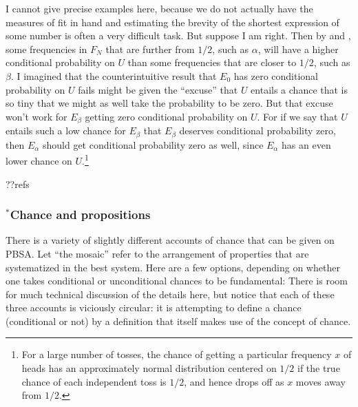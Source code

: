 I cannot give precise examples here, because
we do not actually have the measures of fit in hand and estimating the brevity of the shortest expression of some number is often a very
difficult task. But suppose I am right. Then by  and , some frequencies in $F_N$ that are further from
$1/2$, such as $\alpha$, will have a higher conditional probability on $U$ than some frequencies that are closer to $1/2$, such as
$\beta$. I imagined that the counterintuitive result that $E_0$ has zero conditional probability on $U$ fails might be given the ``excuse''
that $U$ entails a chance that is so tiny that we might as well take the probability to be zero. But that excuse won't work for $E_\beta$
getting zero conditional probability on $U$. For if we say that $U$ entails such a low chance for $E_\beta$ that $E_\beta$ deserves
conditional probability zero, then $E_\alpha$ should get conditional probability zero as well, since $E_\alpha$ has an even lower chance
on $U$.\footnote{For a large number of tosses, the chance of getting a particular frequency $x$ of heads has an approximately normal distribution 
centered on $1/2$ if the true chance of each independent toss is $1/2$, and hence drops off as $x$ moves away from $1/2$.}

??refs

\subsubsection{$^*$Chance and propositions}
There is a variety of slightly different accounts of chance that can be given on PBSA. Let ``the mosaic'' refer to the arrangement of
properties that are systematized in the best system. Here are a few options, depending on whether one takes conditional or unconditional
chances to be fundamental:
There is room for much technical discussion of the details here, but notice that each of these three accounts is viciously circular: it
is attempting to define a chance (conditional or not) by a definition that itself makes use of the concept of chance.

